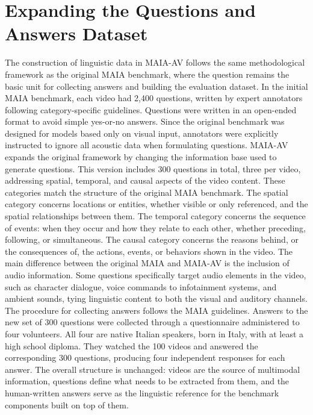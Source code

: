 \section{Expanding the Questions and Answers Dataset}
The construction of linguistic data in MAIA-AV follows the same methodological framework as the original MAIA benchmark, where the question remains the basic unit for collecting answers and building the evaluation dataset. In the initial MAIA benchmark, each video had 2,400 questions, written by expert annotators following category-specific guidelines. Questions were written in an open-ended format to avoid simple yes-or-no answers. Since the original benchmark was designed for models based only on visual input, annotators were explicitly instructed to ignore all acoustic data when formulating questions.
MAIA-AV expands the original framework by changing the information base used to generate questions. This version includes 300 questions in total, three per video, addressing spatial, temporal, and causal aspects of the video content. These categories match the structure of the original MAIA benchmark. The spatial category concerns locations or entities, whether visible or only referenced, and the spatial relationships between them. The temporal category concerns the sequence of events: when they occur and how they relate to each other, whether preceding, following, or simultaneous. The causal category concerns the reasons behind, or the consequences of, the actions, events, or behaviors shown in the video.
The main difference between the original MAIA and MAIA-AV is the inclusion of audio information. Some questions specifically target audio elements in the video, such as character dialogue, voice commands to infotainment systems, and ambient sounds, tying linguistic content to both the visual and auditory channels.
The procedure for collecting answers follows the MAIA guidelines. Answers to the new set of 300 questions were collected through a questionnaire administered to four volunteers. All four are native Italian speakers, born in Italy, with at least a high school diploma. They watched the 100 videos and answered the corresponding 300 questions, producing four independent responses for each answer.
The overall structure is unchanged: videos are the source of multimodal information, questions define what needs to be extracted from them, and the human-written answers serve as the linguistic reference for the benchmark components built on top of them.
